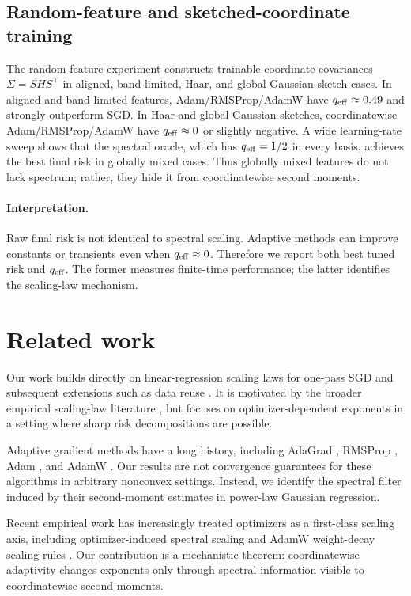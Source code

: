 \documentclass[11pt]{article}
\begin{document}
\subsection{Random-feature and sketched-coordinate training}

The random-feature experiment constructs trainable-coordinate covariances $\Sigma=SHS^\top$ in aligned, band-limited, Haar, and global Gaussian-sketch cases.  In aligned and band-limited features, Adam/RMSProp/AdamW have $q_{\rm eff}\approx0.49$ and strongly outperform SGD.  In Haar and global Gaussian sketches, coordinatewise Adam/RMSProp/AdamW have $q_{\rm eff}\approx0$ or slightly negative.  A wide learning-rate sweep shows that the spectral oracle, which has $q_{\rm eff}=1/2$ in every basis, achieves the best final risk in globally mixed cases.  Thus globally mixed features do not lack spectrum; rather, they hide it from coordinatewise second moments.

\paragraph{Interpretation.}
Raw final risk is not identical to spectral scaling.  Adaptive methods can improve constants or transients even when $q_{\rm eff}\approx0$.  Therefore we report both best tuned risk and $q_{\rm eff}$.  The former measures finite-time performance; the latter identifies the scaling-law mechanism.

\section{Related work}

Our work builds directly on linear-regression scaling laws for one-pass SGD \citep{lin2024scaling} and subsequent extensions such as data reuse \citep{lin2025reuse}.  It is motivated by the broader empirical scaling-law literature \citep{kaplan2020scaling,hoffmann2022chinchilla}, but focuses on optimizer-dependent exponents in a setting where sharp risk decompositions are possible.

Adaptive gradient methods have a long history, including AdaGrad \citep{duchi2011adaptive}, RMSProp \citep{tieleman2012rmsprop}, Adam \citep{kingma2014adam}, and AdamW \citep{loshchilov2017decoupled}.  Our results are not convergence guarantees for these algorithms in arbitrary nonconvex settings.  Instead, we identify the spectral filter induced by their second-moment estimates in power-law Gaussian regression.

Recent empirical work has increasingly treated optimizers as a first-class scaling axis, including optimizer-induced spectral scaling and AdamW weight-decay scaling rules \citep{jha2026optimizer,fan2025weightdecay}.  Our contribution is a mechanistic theorem: coordinatewise adaptivity changes exponents only through spectral information visible to coordinatewise second moments.
\end{document}
